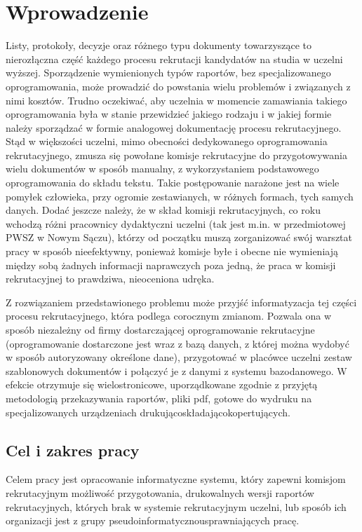\chapter{Wprowadzenie}

Listy, protokoły, decyzje oraz różnego typu dokumenty towarzyszące to nierozłączna część każdego procesu rekrutacji kandydatów na studia w uczelni wyższej. Sporządzenie wymienionych typów raportów, bez specjalizowanego oprogramowania, może prowadzić do powstania wielu problemów i związanych z nimi kosztów.  Trudno oczekiwać, aby uczelnia w momencie zamawiania takiego oprogramowania była w stanie przewidzieć jakiego rodzaju i w jakiej formie należy sporządzać w formie analogowej dokumentację procesu rekrutacyjnego. Stąd w większości uczelni, mimo obecności dedykowanego oprogramowania rekrutacyjnego, zmusza się powołane komisje rekrutacyjne do przygotowywania wielu dokumentów w sposób manualny, z wykorzystaniem podstawowego oprogramowania do składu tekstu. Takie postępowanie narażone jest na wiele pomyłek człowieka, przy ogromie zestawianych, w różnych formach, tych samych danych.  Dodać jeszcze należy, że w skład komisji rekrutacyjnych, co roku wchodzą różni pracownicy dydaktyczni uczelni (tak jest m.in. w przedmiotowej PWSZ w Nowym Sączu), którzy od początku muszą zorganizować swój warsztat pracy w sposób nieefektywny, ponieważ komisje byłe i obecne nie wymieniają między sobą żadnych informacji naprawczych poza jedną, że praca w komisji rekrutacyjnej to prawdziwa, nieoceniona udręka.


Z rozwiązaniem przedstawionego problemu może przyjść  informatyzacja tej części procesu rekrutacyjnego, która podlega corocznym zmianom. Pozwala ona w sposób niezależny od firmy dostarczającej oprogramowanie rekrutacyjne (oprogramowanie dostarczone jest wraz z bazą danych, z której można wydobyć w sposób autoryzowany określone dane), przygotować w placówce uczelni zestaw szablonowych dokumentów i połączyć je z danymi z systemu bazodanowego. W efekcie otrzymuje się wielostronicowe, uporządkowane zgodnie z przyjętą metodologią przekazywania raportów, pliki pdf, gotowe do wydruku na specjalizowanych urządzeniach drukująco\dywiz składająco\dywiz  kopertujących.


\section{Cel i zakres pracy}
Celem pracy jest opracowanie informatyczne systemu, który zapewni komisjom rekrutacyjnym możliwość przygotowania, drukowalnych wersji raportów  rekrutacyjnych, których brak w systemie rekrutacyjnym uczelni, lub sposób ich organizacji jest z grupy pseudoinformatyczno\dywiz usprawniających pracę.


